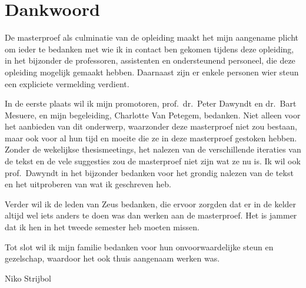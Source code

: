 \chapter*{Dankwoord}\label{ch:dankwoord}

De masterproef als culminatie van de opleiding maakt het mijn aangename plicht om ieder te bedanken met wie ik in contact ben gekomen tijdens deze opleiding, in het bijzonder de professoren, assistenten en ondersteunend personeel, die deze opleiding mogelijk gemaakt hebben.
Daarnaast zijn er enkele personen wier steun een expliciete vermelding verdient.

In de eerste plaats wil ik mijn promotoren, prof.\ dr.\ Peter Dawyndt en dr.\ Bart Mesuere, en mijn begeleiding, Charlotte Van Petegem, bedanken.
Niet alleen voor het aanbieden van dit onderwerp, waarzonder deze masterproef niet zou bestaan, maar ook voor al hun tijd en moeite die ze in deze masterproef gestoken hebben.
Zonder de wekelijkse thesismeetings, het nalezen van de verschillende iteraties van de tekst en de vele suggesties zou de masterproef niet zijn wat ze nu is.
Ik wil ook prof.\ Dawyndt in het bijzonder bedanken voor het grondig nalezen van de tekst en het uitproberen van wat ik geschreven heb.

Verder wil ik de leden van Zeus  bedanken, die ervoor zorgden dat er in de kelder altijd wel iets anders te doen was dan werken aan de masterproef.
Het is jammer dat ik hen in het tweede semester heb moeten missen.

Tot slot wil ik mijn familie bedanken voor hun onvoorwaardelijke steun en gezelschap, waardoor het ook thuis aangenaam werken was.

\begin{flushright}
    Niko Strijbol
\end{flushright}

